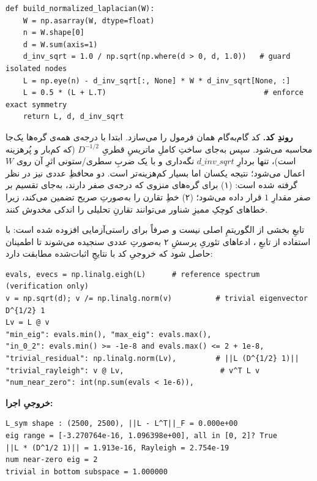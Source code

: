 \documentclass[13pt]{extarticle}
\newenvironment{pycode}{\begin{latin}\lstset{style=py}}{\end{latin}}
\newenvironment{consoleout}{\par\smallskip\begin{latin}\lstset{style=out}}{\end{latin}}
\newcommand{\file}[1]{\lr{\texttt{#1}}}
\begin{document}
\begin{pycode}
\begin{lstlisting}
def build_normalized_laplacian(W):
    W = np.asarray(W, dtype=float)
    n = W.shape[0]
    d = W.sum(axis=1)
    d_inv_sqrt = 1.0 / np.sqrt(np.where(d > 0, d, 1.0))   # guard isolated nodes
    L = np.eye(n) - d_inv_sqrt[:, None] * W * d_inv_sqrt[None, :]
    L = 0.5 * (L + L.T)                                    # enforce exact symmetry
    return L, d, d_inv_sqrt
\end{lstlisting}
\end{pycode}

\noindent\textbf{روندِ کد.} کد گام‌به‌گام همان فرمول را می‌سازد. ابتدا با \file{W.sum(axis=1)} درجه‌ی همه‌ی گره‌ها یک‌جا محاسبه می‌شود. سپس به‌جای ساختِ کاملِ ماتریسِ قطریِ $D^{-1/2}$ (که کم‌بار و پُرهزینه است)، تنها بردارِ $d\_inv\_sqrt$ نگه‌داری و با یک ضربِ سطری/ستونی اثرِ آن روی $W$ اعمال می‌شود؛ نتیجه یکسان اما بسیار کم‌هزینه‌تر است. دو محافظِ عددی نیز در نظر گرفته شده است: (۱) برای گره‌های منزوی که درجه‌ی صفر دارند، به‌جای تقسیم بر صفر مقدارِ $1$ قرار داده می‌شود؛ (۲) خطِ \file{L = 0.5*(L + L.T)} تقارن را به‌صورتِ صریح تضمین می‌کند، زیرا خطاهای کوچکِ ممیزِ شناور می‌توانند تقارنِ تحلیلی را اندکی مخدوش کنند.

\smallskip
\noindent تابعِ \file{spectral\_report} بخشی از الگوریتمِ اصلی نیست و صرفاً برای راستی‌آزمایی افزوده شده است: با استفاده از تابعِ \file{eigh}، ادعاهای تئوریِ پرسشِ ۲ به‌صورتِ عددی سنجیده می‌شوند تا اطمینان حاصل شود که خروجیِ کد با نتایجِ اثبات‌شده مطابقت دارد:

\begin{pycode}
\begin{lstlisting}
evals, evecs = np.linalg.eigh(L)      # reference spectrum (verification only)
v = np.sqrt(d); v /= np.linalg.norm(v)          # trivial eigenvector D^{1/2} 1
Lv = L @ v
"min_eig": evals.min(), "max_eig": evals.max(),
"in_0_2": evals.min() >= -1e-8 and evals.max() <= 2 + 1e-8,
"trivial_residual": np.linalg.norm(Lv),         # ||L (D^{1/2} 1)||
"trivial_rayleigh": v @ Lv,                      # v^T L v
"num_near_zero": int(np.sum(evals < 1e-6)),
\end{lstlisting}
\end{pycode}

\noindent\textbf{خروجیِ اجرا:}
\begin{consoleout}
\begin{lstlisting}
L_sym shape : (2500, 2500), ||L - L^T||_F = 0.000e+00
eig range = [-3.270764e-16, 1.096398e+00], all in [0, 2]? True
||L * (D^1/2 1)|| = 1.913e-16, Rayleigh = 2.754e-19
num near-zero eig = 2
trivial in bottom subspace = 1.000000
\end{lstlisting}
\end{consoleout}
\end{document}
